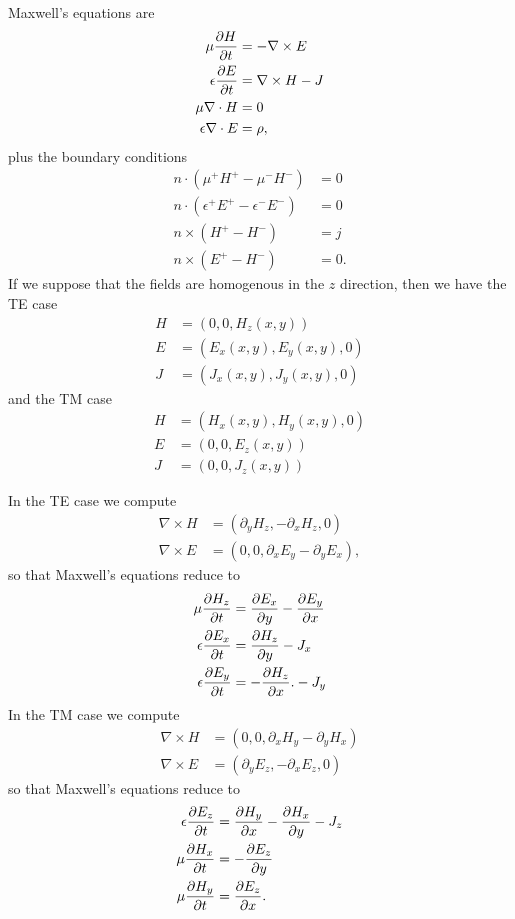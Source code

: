 Maxwell's equations are
\begin{align*}
  \mu \pd{H}{t} &= -\nabla \times E \\
  \epsilon \pd{E}{t} &= \nabla \times H - J \\
  \mu \nabla \cdot H &= 0 \\
  \epsilon \nabla \cdot E &= \rho,
\end{align*}
plus the boundary conditions
\begin{align*}
  n \cdot (\mu^+ H^+ - \mu^-H^-) &= 0 \\
  n \cdot (\epsilon^+ E^+ - \epsilon^- E^-) &= 0 \\
  n \times (H^+ - H^-) &= j \\
  n \times (E^+ - H^-) &= 0.
\end{align*}
If we suppose that the fields are homogenous in the $z$ direction,
then we have the TE case
\begin{align*}
  H &= (0, 0, H_z(x, y)) \\
  E &= (E_x(x, y), E_y(x, y), 0) \\
  J &= (J_x(x, y), J_y(x, y), 0)
\end{align*}
and the TM case
\begin{align*}
  H &= (H_x(x, y), H_y(x, y), 0) \\
  E &= (0, 0, E_z(x, y)) \\
  J &= (0, 0, J_z(x, y))
\end{align*}

In the TE case we compute
\begin{align*}
  \nabla \times H &= (\partial_yH_z, -\partial_xH_z, 0) \\
  \nabla \times E &= (0, 0, \partial_xE_y - \partial_yE_x),
\end{align*}
so that Maxwell's equations reduce to
\begin{align*}
  \mu \pd{H_z}{t} &= \pd{E_x}{y} - \pd{E_y}{x} \\
  \epsilon \pd{E_x}{t} &= \pd{H_z}{y}  - J_x\\
  \epsilon \pd{E_y}{t} &= -\pd{H_z}{x}. - J_y
\end{align*}
In the TM case we compute
\begin{align*}
  \nabla \times H &= (0, 0, \partial_xH_y - \partial_yH_x) \\
  \nabla \times E &= (\partial_yE_z, -\partial_xE_z, 0)
\end{align*}
so that Maxwell's equations reduce to
\begin{align*}
  \epsilon \pd{E_z}{t} &= \pd{H_y}{x} - \pd{H_x}{y}  - J_z\\
  \mu \pd{H_x}{t} &= -\pd{E_z}{y} \\
  \mu \pd{H_y}{t} &= \pd{E_z}{x}.
\end{align*}
